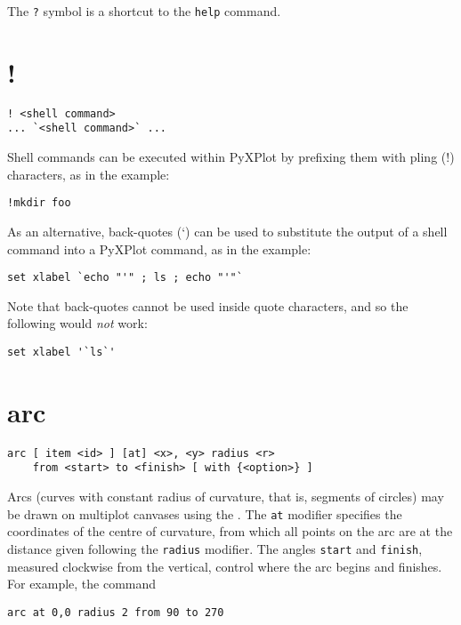 The {\tt ?} symbol is a shortcut to the {\tt help} command.


\section{!}\indcmd{!}

\begin{verbatim}
! <shell command>
... `<shell command>` ...
\end{verbatim}

Shell commands can be executed within PyXPlot by prefixing them with
pling (!) characters, as in the example:

\begin{verbatim}
!mkdir foo
\end{verbatim}

\noindent As an alternative, back-quotes (`) can be used to substitute the
output of a shell command into a PyXPlot command, as in the example:

\begin{verbatim}
set xlabel `echo "'" ; ls ; echo "'"`
\end{verbatim}

\noindent Note that back-quotes cannot be used inside quote characters, and so
the following would \textit{not} work:

\begin{verbatim}
set xlabel '`ls`'
\end{verbatim}


\section{arc}

\begin{verbatim}
arc [ item <id> ] [at] <x>, <y> radius <r>
    from <start> to <finish> [ with {<option>} ]
\end{verbatim}

Arcs (curves with constant radius of curvature, that is, segments of circles)
may be drawn on multiplot canvases using the .  The {\tt at}
modifier specifies the coordinates of the centre of curvature, from which all
points on the arc are at the distance given following the {\tt radius} modifier.
The angles {\tt start} and {\tt finish}, measured clockwise from the vertical,
control where the arc begins and finishes.  For example, the command

\begin{verbatim}
arc at 0,0 radius 2 from 90 to 270
\end{verbatim}

